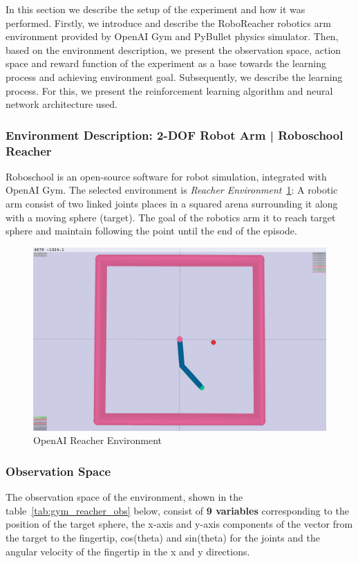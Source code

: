 In this section we describe the setup of the experiment and how it was performed. Firstly, we introduce and describe the RoboReacher robotics arm environment provided by OpenAI Gym and PyBullet physics simulator. Then, based on the environment description, we present the observation space, action space and reward function of the experiment as a base towards the learning process and achieving environment goal. Subsequently, we describe the learning process. For this, we present the reinforcement learning algorithm and neural network architecture used.


\subsubsection{Environment Description: 2-DOF Robot Arm | Roboschool Reacher}
Roboschool is an open-source software for robot simulation, integrated with OpenAI Gym. The selected environment is \textit{Reacher Environment}~\ref{fig:openai_reacher}: A robotic arm consist of two linked joints places in a squared arena surrounding it along with a moving sphere (target). The goal of the robotics arm it to reach target sphere and maintain following the point until the end of the episode. 

\begin{figure}[!htb]
		\centering
		\includegraphics[width=0.7\linewidth]{figures/envs/openai_roboreacher.png}
		\caption{OpenAI Reacher Environment}
		\label{fig:openai_reacher}
\end{figure}

\subsubsection{Observation Space}

The observation space of the environment, shown in the table~\ref{tab:gym_reacher_obs} below, consist of \textbf{9 variables} corresponding to the position of the target sphere, the x-axis and y-axis components of the vector from the target to the fingertip, cos(theta) and sin(theta) for the joints and the angular velocity of the fingertip in the x and y directions.

